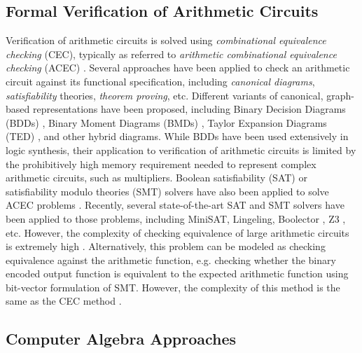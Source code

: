 \subsection{Formal Verification of Arithmetic Circuits}
Verification of arithmetic circuits is solved using \textit{combinational equivalence checking} (CEC), typically as referred to \textit{arithmetic combinational equivalence checking} (ACEC) \cite{sayedformal:date-2016}. Several approaches have been applied to check an arithmetic circuit against its functional specification, including \textit{canonical diagrams}, \textit{satisfiability} theories, \textit{theorem proving}, etc. Different variants of canonical, graph-based representations have been proposed, including Binary Decision Diagrams (BDDs) \cite{bryant:1986-bdd}, Binary Moment Diagrams (BMDs) \cite{bmd95} \cite{bryant:tr97}, Taylor Expansion Diagrams (TED) \cite{ted:tcomp06}, and other hybrid diagrams.
%
While BDDs have been used extensively in logic synthesis, their application to verification of arithmetic circuits is limited by the prohibitively high memory requirement needed to represent complex arithmetic circuits, such as multipliers. 
Boolean satisfiability (SAT) or satisfiability modulo theories (SMT) solvers have also been applied to solve ACEC problems \cite{goldberg2001using}. Recently, several state-of-the-art SAT and SMT solvers have been applied to those problems, including MiniSAT\cite{sorensson:2005-minisat}, Lingeling\cite{biere2013lingeling}, Boolector \cite{niemetz:2015boolector}, Z3 \cite{de:2008-z3}, etc. However, the complexity of checking equivalence of large arithmetic circuits is extremely high \cite{pruss2015TCAD:efficient}\cite{yu:2016-tcad-verification}. Alternatively, this problem can be modeled as checking equivalence against the arithmetic function, e.g. checking whether the binary encoded output function is equivalent to the expected arithmetic function using bit-vector formulation of SMT. However, the complexity of this method is the same as the CEC method \cite{yu:2016-tcad-verification}. 

\subsection{Computer Algebra Approaches}

